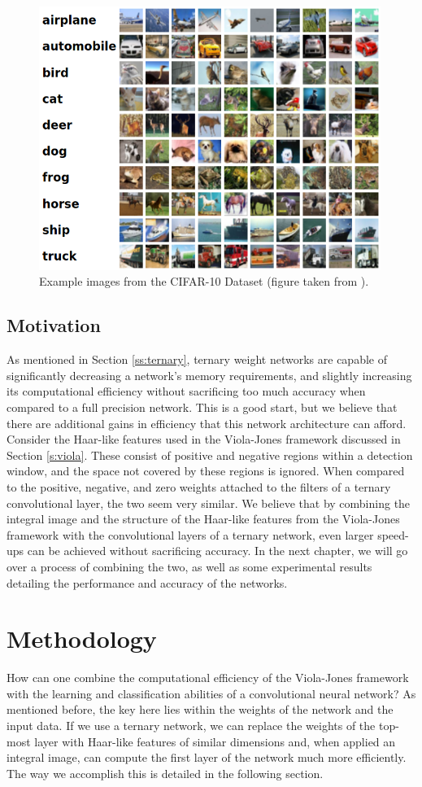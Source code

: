 \documentclass[11pt,a4paper,oldfontcommands]{memoir}
\begin{document}
\begin{figure}
    \centering
    \includegraphics[width=30em]{Images/cifar_examples.png}
    \caption{Example images from the CIFAR-10 Dataset (figure taken from \cite{cifar-image}).}
    \label{fig:cifar_examples}
\end{figure}

\section{Motivation}
As mentioned in Section \ref{ss:ternary}, ternary weight networks are capable of significantly decreasing a network's memory requirements, and slightly increasing its computational efficiency without sacrificing too much accuracy when compared to a full precision network. This is a good start, but we believe that there are additional gains in efficiency that this network architecture can afford. Consider the Haar-like features used in the Viola-Jones framework discussed in Section \ref{s:viola}. These consist of positive and negative regions within a detection window, and the space not covered by these regions is ignored. When compared to the positive, negative, and zero weights attached to the filters of a ternary convolutional layer, the two seem very similar. We believe that by combining the integral image and the structure of the Haar-like features from the Viola-Jones framework with the convolutional layers of a ternary network, even larger speed-ups can be achieved without sacrificing accuracy. In the next chapter, we will go over a process of combining the two, as well as some experimental results detailing the performance and accuracy of the networks.


\chapter{Methodology}
How can one combine the computational efficiency of the Viola-Jones framework with the learning and classification abilities of a convolutional neural network? As mentioned before, the key here lies within the weights of the network and the input data. If we use a ternary network, we can replace the weights of the top-most layer with Haar-like features of similar dimensions and, when applied an integral image, can compute the first layer of the network much more efficiently. The way we accomplish this is detailed in the following section. 
\end{document}
